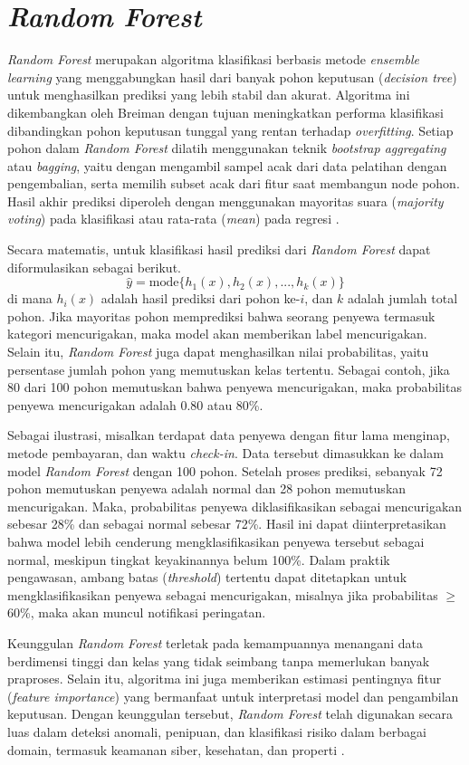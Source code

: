 \section{{\it Random Forest}}\label{sec:random_forest}

{\it Random Forest} merupakan algoritma klasifikasi berbasis metode \textit{ensemble learning} yang menggabungkan hasil dari banyak pohon keputusan (\textit{decision tree}) untuk menghasilkan prediksi yang lebih stabil dan akurat. Algoritma ini dikembangkan oleh Breiman  \cite{breiman2001random} dengan tujuan meningkatkan performa klasifikasi dibandingkan pohon keputusan tunggal yang rentan terhadap {\it overfitting}. Setiap pohon dalam {\it Random Forest} dilatih menggunakan teknik {\it bootstrap aggregating} atau {\it bagging}, yaitu dengan mengambil sampel acak dari data pelatihan dengan pengembalian, serta memilih subset acak dari fitur saat membangun node pohon. Hasil akhir prediksi diperoleh dengan menggunakan mayoritas suara (\textit{majority voting}) pada klasifikasi atau rata-rata (\textit{mean}) pada regresi \cite{hastie2009elements}.
    
    Secara matematis, untuk klasifikasi hasil prediksi dari {\it Random Forest} dapat diformulasikan sebagai berikut.  
    \[
    \hat{y} = \text{mode}\{h_1(x), h_2(x), ..., h_k(x)\}
    \]  
    di mana \( h_i(x) \) adalah hasil prediksi dari pohon ke-\( i \), dan \( k \) adalah jumlah total pohon. Jika mayoritas pohon memprediksi bahwa seorang penyewa termasuk kategori mencurigakan, maka model akan memberikan label mencurigakan. Selain itu, {\it Random Forest} juga dapat menghasilkan nilai probabilitas, yaitu persentase jumlah pohon yang memutuskan kelas tertentu. Sebagai contoh, jika 80 dari 100 pohon memutuskan bahwa penyewa mencurigakan, maka probabilitas penyewa mencurigakan adalah 0.80 atau 80\%.
    
    Sebagai ilustrasi, misalkan terdapat data penyewa dengan fitur lama menginap, metode pembayaran, dan waktu {\it check-in}. Data tersebut dimasukkan ke dalam model {\it Random Forest} dengan 100 pohon. Setelah proses prediksi, sebanyak 72 pohon memutuskan penyewa adalah normal dan 28 pohon memutuskan mencurigakan. Maka, probabilitas penyewa diklasifikasikan sebagai mencurigakan sebesar 28\% dan sebagai normal sebesar 72\%. Hasil ini dapat diinterpretasikan bahwa model lebih cenderung mengklasifikasikan penyewa tersebut sebagai normal, meskipun tingkat keyakinannya belum 100\%. Dalam praktik pengawasan, ambang batas (\textit{threshold}) tertentu dapat ditetapkan untuk mengklasifikasikan penyewa sebagai mencurigakan, misalnya jika probabilitas $\geq$60\%, maka akan muncul notifikasi peringatan. 
    
    Keunggulan {\it Random Forest} terletak pada kemampuannya menangani data berdimensi tinggi dan kelas yang tidak seimbang tanpa memerlukan banyak praproses. Selain itu, algoritma ini juga memberikan estimasi pentingnya fitur (\textit{feature importance}) yang bermanfaat untuk interpretasi model dan pengambilan keputusan. Dengan keunggulan tersebut, {\it Random Forest} telah digunakan secara luas dalam deteksi anomali, penipuan, dan klasifikasi risiko dalam berbagai domain, termasuk keamanan siber, kesehatan, dan properti \cite{liaw2002classification}.
